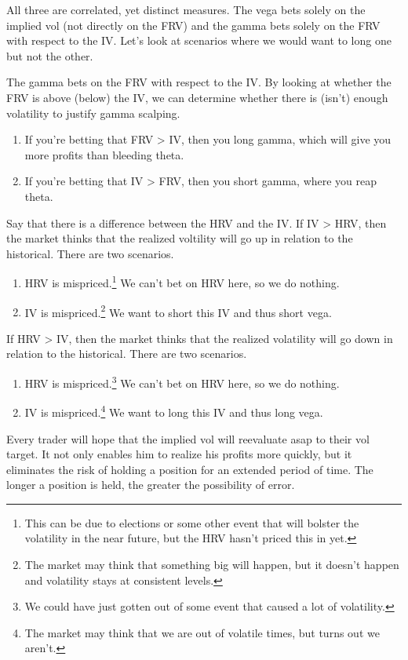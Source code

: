\documentclass{article}
\begin{document}
    All three are correlated, yet distinct measures. The vega bets solely on the implied vol (not directly on the FRV) and the gamma bets solely on the FRV with respect to the IV. Let's look at scenarios where we would want to long one but not the other.

    \begin{example}
      \label{ex:gamma-scapling}
      The gamma bets on the FRV with respect to the IV. By looking at whether the FRV is above (below) the IV, we can determine whether there is (isn't) enough volatility to justify gamma scalping.
      \begin{enumerate}
        \item If you're betting that FRV > IV, then you long gamma, which will give you more profits than bleeding theta.
        \item If you're betting that IV > FRV, then you short gamma, where you reap theta.
      \end{enumerate}
    \end{example}

    \begin{example}
      \label{ex:long-short-vega}
      Say that there is a difference between the HRV and the IV. If IV > HRV, then the market thinks that the realized voltility will go up in relation to the historical. There are two scenarios.
      \begin{enumerate}
        \item HRV is mispriced.\footnote{This can be due to elections or some other event that will bolster the volatility in the near future, but the HRV hasn't priced this in yet. } We can't bet on HRV here, so we do nothing.
        \item IV is mispriced.\footnote{The market may think that something big will happen, but it doesn't happen and volatility stays at consistent levels. } We want to short this IV and thus short vega.
      \end{enumerate}

      If HRV > IV, then the market thinks that the realized volatility will go down in relation to the historical. There are two scenarios.
      \begin{enumerate}
        \item HRV is mispriced.\footnote{We could have just gotten out of some event that caused a lot of volatility.} We can't bet on HRV here, so we do nothing.
        \item IV is mispriced.\footnote{The market may think that we are out of volatile times, but turns out we aren't.} We want to long this IV and thus long vega.
      \end{enumerate}
      Every trader will hope that the implied vol will reevaluate asap to their vol target. It not only enables him to realize his profits more quickly, but it eliminates the risk of holding a position for an extended period of time. The longer a position is held, the greater the possibility of error.
    \end{example}
\end{document}
